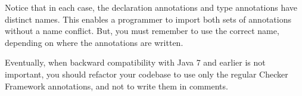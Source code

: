 Notice that in each case, the declaration annotations and type annotations
have distinct names.  This enables a programmer to import both sets of
annotations without a name conflict.  But, you must remember to use the
correct name, depending on where the annotations are written.

Eventually, when backward compatibility with Java 7 and earlier is not important,
you should refactor your codebase to use only the regular Checker Framework
annotations, and not to write them in comments.




